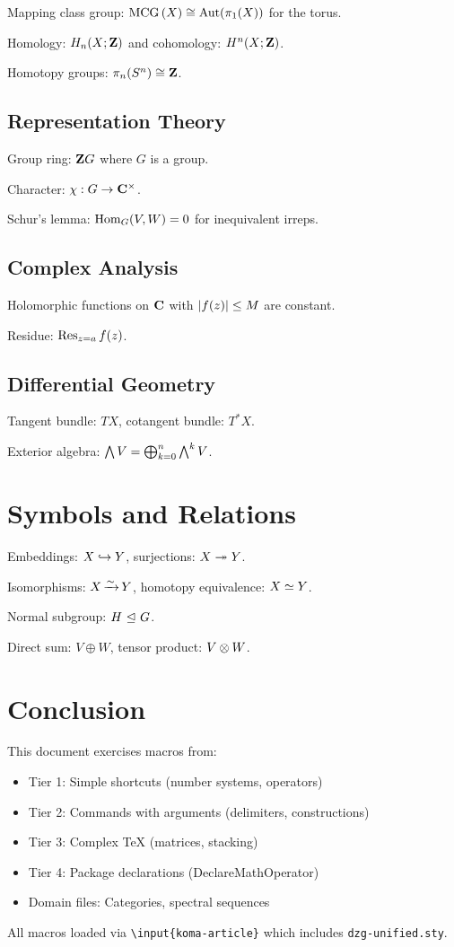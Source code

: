 \documentclass[11pt]{scrartcl}
\begin{document}
Mapping class group: ${{\operatorname{MCG}} \left( {X} \right)} \cong \operatorname{Aut}(\pi_1(X))$ for the torus.

Homology: $H_n(X; {\mathbf{Z}})$ and cohomology: $H^n(X; {\mathbf{Z}})$.

Homotopy groups: $\pi_n(S^n) \cong {\mathbf{Z}}$.

\subsection{Representation Theory}
Group ring: ${{\mathbf{Z}} G}$ where $G$ is a group.

Character: $\chi: G \to { {{\mathbf{C}}}^{\times} }$.

Schur's lemma: ${ \operatorname{Hom} }_G(V, W) = 0$ for inequivalent irreps.

\subsection{Complex Analysis}
Holomorphic functions on ${\mathbf{C}}$ with ${\left\lvert {f(z)} \right\rvert} \leq M$ are constant.

Residue: $\operatorname{Res}_{z=a} f(z)$.

\subsection{Differential Geometry}
Tangent bundle: $TX$, cotangent bundle: $T^*X$.

Exterior algebra: $\bigwedge\nolimits V = \bigoplus_{k=0}^n \bigwedge\nolimits^k V$.

\section{Symbols and Relations}

Embeddings: $X \hookrightarrow Y$, surjections: $X \twoheadrightarrow Y$.

Isomorphisms: $X { \, \xrightarrow{\sim}\, } Y$, homotopy equivalence: $X \simeq Y$.

Normal subgroup: $H {~\trianglelefteq~} G$.

Direct sum: $V \oplus W$, tensor product: $V \otimes W$.

\section{Conclusion}

This document exercises macros from:
\begin{itemize}
\item Tier 1: Simple shortcuts (number systems, operators)
\item Tier 2: Commands with arguments (delimiters, constructions)
\item Tier 3: Complex TeX (matrices, stacking)
\item Tier 4: Package declarations (DeclareMathOperator)
\item Domain files: Categories, spectral sequences
\end{itemize}

All macros loaded via \texttt{\textbackslash input\{koma-article\}} which includes \texttt{dzg-unified.sty}.
\end{document}
